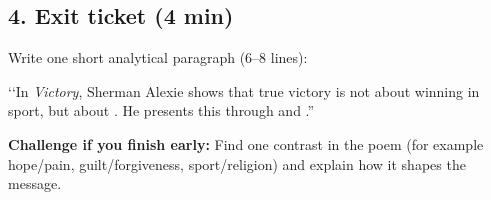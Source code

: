 \documentclass[10pt,a4paper]{article}
\newcommand{\qm}[1]{‘‘#1”}
\begin{document}
\subsection{4. Exit ticket (4 min)}
Write one short analytical paragraph (6--8 lines):

\qm{In \textit{Victory}, Sherman Alexie shows that true victory is not about winning in sport, but about \underline{\hspace{4cm}}. He presents this through \underline{\hspace{4cm}} and \underline{\hspace{4cm}}.}

\vspace{1em}
\textbf{Challenge if you finish early:} Find one contrast in the poem (for example hope/pain, guilt/forgiveness, sport/religion) and explain how it shapes the message.
\end{document}
